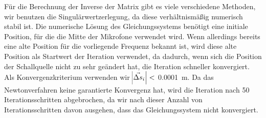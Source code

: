 Für die Berechnung der Inverse der Matrix gibt es viele verschiedene Methoden, wir benutzen die Singulärwertzerlegung, da diese verhältnismäßig numerisch stabil ist. Die numerische Lösung des Gleichungssystems benötigt eine initiale Position, für die die Mitte der Mikrofone verwendet wird. Wenn allerdings bereits eine alte Position für die vorliegende Frequenz bekannt ist, wird diese alte Position als Startwert der Iteration verwendet, da dadurch, wenn sich die Position der Schallquelle nicht zu sehr geändert hat, die Iteration schneller konvergiert. Als Konvergenzkriterium verwenden wir $\abs{\vec{\Delta{s}}_i} <$ \SI{0.0001}{\meter}. Da das Newtonverfahren keine garantierte Konvergenz hat, wird die Iteration nach \num{50} Iterationsschritten abgebrochen, da wir nach dieser Anzahl von Iterationsschritten davon ausgehen, dass das Gleichungssystem nicht konvergiert.

